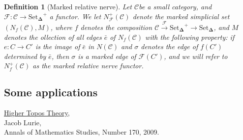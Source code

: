 \documentclass[12pt]{amsart}
\newcommand{\8}{\ensuremath{\infty}}
\newcommand{\C}{\ensuremath{\mathscr{C}}}
\newcommand{\SSet}{\ensuremath{\text{Set}_{\boldsymbol{\Delta}}}}
\newtheorem{definition}{Definition}
\begin{document}
\begin{definition}[Marked relative nerve]
  Let \C be a small category, and $\mathcal{F}: \C \rightarrow \SSet^+$ a functor. We let $N_\mathcal{F}^+(\C)$ denote the marked simplicial set $(N_f(\C), M)$, where $f$ denotes the composition $\C \overset{\mathcal{F}}{\rightarrow} \SSet^+ \rightarrow \SSet$, and $M$ denotes the ollection of all edges $\bar{e}$ of $N_f(\C)$ with the following property: if $e: C \rightarrow C'$ is the image of $\bar{e}$ in $N(\C)$ and $\sigma$ denotes the edge of $f(C')$ determined by $\bar{e}$, then $\sigma$ is a marked edge of $\mathcal{F}(C')$, and we will refer to $N_f^+(\C)$ as the marked relative nerve functor.
\end{definition}

\subsection{Some applications}


\begin{thebibliography}{99}
  \href{https: //arxiv.org/abs/math/0608040}{Higher Topos Theory}, \\
  Jacob Lurie, \\
  Annals of Mathematics Studies, Number 170, 2009.
\end{thebibliography}
\end{document}
